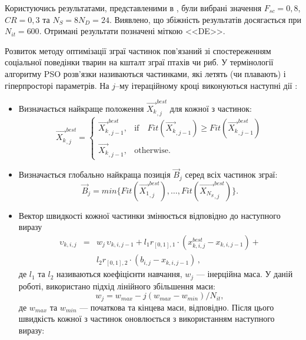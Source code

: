 Користуючись результатами, представленими в \cite{DEWang},
були вибрані значення $F_{sc}=0,8$, $C\!R=0,3$ та $N_S=8N_D=24$.
Виявлено, що збіжність результатів досягається при $N_{it}=600$.
Отримані результати позначені міткою <<DE>>.

Розвиток методу оптимізації зграї частинок пов'язаний зі спостереженням соціальної поведінки тварин на кшталт зграї птахів чи риб.
У термінології алгоритму PSO розв'язки називаються частинками, які летять (чи плавають) і гіперпросторі параметрів.
На $j$--му ітераційному кроці виконуються наступні дії \cite{PSO_Ye}:
\begin{itemize}
  \item Визначається найкраще положення $\overrightarrow{X_k}_{,j}^{best}$ для кожної з частинок:
 \begin{equation}
 \label{eqPSO_PB}
 \overrightarrow{X_k}_{,j}^{best}=\left\{
 \begin{array}{ll}
 \overrightarrow{X_k}_{,j-1}^{best},& \text{if} \quad Fit(\overrightarrow{X_k}_{,j-1})\geq Fit(\overrightarrow{X_k}_{,j-1}^{best})\\
 \overrightarrow{X_{k}}_{,j-1},& \text{otherwise}.
 \end{array}
 \right.
 \end{equation}
  \item  Визначається глобально найкраща позиція $\overrightarrow{B}_{j}$ серед всіх частинок зграї:
 \begin{equation}
 \label{eqPSO_GB}
 \overrightarrow{B}_{j}=min\{ Fit(\overrightarrow{X_1}_{,j}^{best}),\ldots, Fit(\overrightarrow{X_{N_S}}_{,j}^{best})\}.
 \end{equation}
  \item Вектор швидкості кожної частинки змінюється відповідно до наступного виразу
\begin{eqnarray}
 \label{eqPSO_Vel}
\upsilon_{k,i,j}&=&w_j\,\upsilon_{k,i,j-1}+l_1r_{[0,1],1}\cdot(x_{k,i,j}^{best}-x_{k,i,j-1})+
\nonumber\\
&&l_2r_{[0,1],2}\cdot(b_{i,j}-x_{k,i,j-1})
\,,
\end{eqnarray}
де
$l_1$ та $l_2$ називаються коефіцієнти навчання, $w_j$ --- інерційна маса.
У даній роботі, використано підхід лінійного збільшення маси:
 \begin{equation}
 \label{eqPSO_W}
 w_j=w_{max}-j(w_{max}-w_{min})/N_{it},
 \end{equation}
де
$w_{max}$ та $w_{min}$ --- початкова та кінцева маси, відповідно.
Після цього швидкість кожної з частинок оновлюється з використанням наступного виразу:

\end{itemize}
